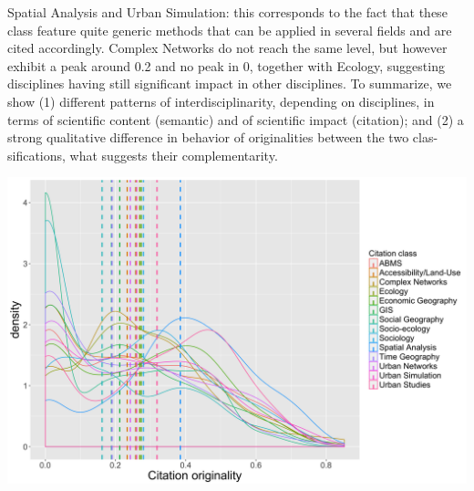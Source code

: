 {Spatial Analysis and Urban Simulation: this corresponds to the fact that these class feature quite generic methods that can be applied in several fields and are cited accordingly. Complex Networks do not reach the same level, but however exhibit a peak around 0.2 and no peak in 0, together with Ecology, suggesting disciplines having still significant impact in other disciplines. To summarize, we show (1) different patterns of interdisciplinarity, depending on disciplines, in terms of scientific content (semantic) and of scientific impact (citation); and (2) a strong qualitative difference in behavior of originalities between the two clas- sifications, what suggests their complementarity.


\begin{center}
\includegraphics[width=0.8\linewidth]{figures/scim_citation_originalities_citclass.png}
\end{center}

}
